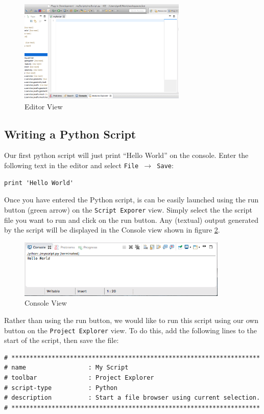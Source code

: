 \begin{figure}[!hb]
\centering
\includegraphics[width=8cm]{images/editor}
\caption{Editor View}
\label{fig:editor}
\end{figure}


\subsection{Writing a Python Script}

Our first python script will just print ``Hello World'' on the console. Enter
the following text in the editor and select \texttt{File $\rightarrow$ Save}:

\begin{verbatim}
print 'Hello World'
\end{verbatim}

Once you have entered the Python script, is can be easily launched using the run
button (green arrow) on the \texttt{Script Exporer} view. Simply select the
the script file you want to run and click on the run button. Any (textual)
output generated by the script will be displayed in the Console view shown in
figure \ref{fig:console}.

\begin{figure}[!ht]
\centering
\includegraphics[width=10cm]{images/console}
\caption{Console View}
\label{fig:console}
\end{figure}

Rather than using the run button, we would like to run this script using our own
button on the \texttt{Project Explorer} view. To do this, add the following
lines to the start of the script, then save the file:

{\small
\begin{verbatim}
# ********************************************************************  
# name                 : My Script 
# toolbar              : Project Explorer  
# script-type          : Python  
# description          : Start a file browser using current selection.  
# ******************************************************************** 
\end{verbatim}
}

